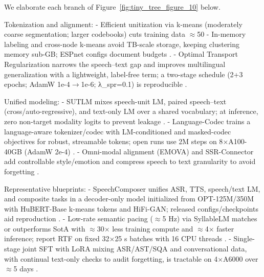 \documentclass{article}
\begin{document}
We elaborate each branch of Figure~\ref{fig:tiny_tree_figure_10} below.

Tokenization and alignment:
- Efficient unitization via k-means (moderately coarse segmentation; larger codebooks) cuts training data $\approx$50%
- In-memory labeling and cross-node k-means avoid TB-scale storage, keeping clustering memory sub-GB; ESPnet configs document budgets \cite{chen2023reducingbarriersselfsupervisedlearninghu}.
- Optimal Transport Regularization narrows the speech--text gap and improves multilingual generalization with a lightweight, label-free term; a two-stage schedule (2+3 epochs; AdamW 1e-4$\rightarrow$1e-6; λ_spr=0.1) is reproducible \cite{xu2025optimaltransportregularizationspeechtext}.

Unified modeling:
- SUTLM mixes speech-unit LM, paired speech--text (cross/auto-regressive), and text-only LM over a shared vocabulary; at inference, zero non-target modality logits to prevent leakage \cite{entry2025towardjointlanguagemodelingspeechunitste,cuervo2025textspeechlanguagemodelsimprovedcrossmod,wang2024c3llmconditionalmultimodalcontentgenerat}.
- Language-Codec trains a language-aware tokenizer/codec with LM-conditioned and masked-codec objectives for robust, streamable tokens; open runs use 2M steps on 8$\times$A100-40GB (AdamW 2e-4) \cite{ji2025languagecodecbridgingdiscreterepresentat,kim2024enclapcombiningneuralaudiocodectextjoint,huang2024repcodecspeechrepresentationcodectokeniz}.
- Omni-modal alignment (EMOVA) and SSR-Connector add controllable style/emotion and compress speech to text granularity to avoid forgetting \cite{chen2025emovaempoweringlanguagemodelsseehearspea,tan2025ssralignmentawaremodalityconnectorspeech}.

Representative blueprints:
- SpeechComposer unifies ASR, TTS, speech/text LM, and composite tasks in a decoder-only model initialized from OPT-125M/350M with HuBERT-Base k-means tokens and HiFi-GAN; released configs/checkpoints aid reproduction \cite{wu2024speechcomposerunifyingmultiplespeechtask}.
- Low-rate semantic pacing ($\approx$5 Hz) via SyllableLM matches or outperforms SotA with $\approx$30$\times$ less training compute and $\approx$4$\times$ faster inference; report RTF on fixed 32$\times$25 s batches with 16 CPU threads \cite{baade2024syllablelmlearningcoarsesemanticunitsspe}.
- Single-stage joint SFT with LoRA mixing ASR/AST/SQA and conversational data, with continual text-only checks to audit forgetting, is tractable on 4$\times$A6000 over $\approx$5 days \cite{har-tuv2025pastphoneticacousticspeechtokenizer,hsiao2025analyzingmitigationstrategiescatastrophi}.
\end{document}

